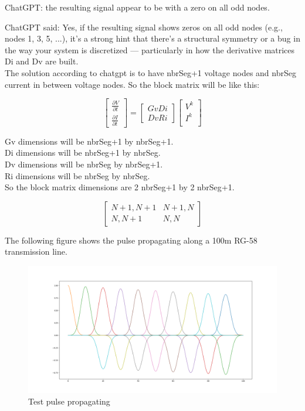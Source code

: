 \documentclass[12pt, letterpaper]{article}
\begin{document}
ChatGPT:
the resulting signal appear to be with a zero on all odd nodes.
	
	
	ChatGPT said:
	Yes, if the resulting signal shows zeros on all odd nodes (e.g., nodes 1, 3, 5, ...), it's a strong hint that there’s a structural symmetry or a bug in the way your system is discretized — particularly in how the derivative matrices Di and Dv are built.\\
	
The solution according to chatgpt is to have nbrSeg+1 voltage nodes and nbrSeg current in between voltage nodes. So the block matrix will be like this:

\begin{equation}
	\begin{bmatrix}
		\frac{\partial{V}}{\partial{t}} \\
		\frac{\partial{I}}{\partial{t}} 
	\end{bmatrix}	
	=
	\begin{bmatrix}
		Gv Di \\
		Dv Ri
	\end{bmatrix}
	\begin{bmatrix}
		V^k \\
		I^k \\
	\end{bmatrix}
\end{equation}

Gv dimensions will be nbrSeg+1 by nbrSeg+1.\\
Di dimensions will be nbrSeg+1 by nbrSeg.\\
Dv dimensions will be nbrSeg by nbrSeg+1.\\
Ri dimensions will be nbrSeg by nbrSeg.\\

So the block matrix dimensions are 2 nbrSeg+1 by 2 nbrSeg+1.

\begin{equation}
	\begin{bmatrix}
		N+1, N+1 &  N+1, N \\
		N, N+1 & N, N
	\end{bmatrix}
\end{equation}

The following figure shows the pulse propagating along a 100m RG-58 transmission line.

\begin{figure}[h]
	\centering
	\includegraphics[width=1\textwidth]{pulse-python.png} %
	\caption{Test pulse propagating}
	\label{fig:example}
\end{figure}
\end{document}
